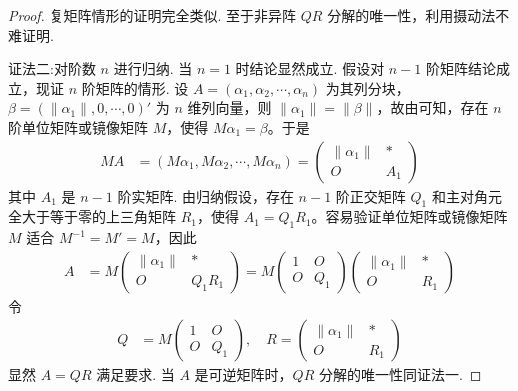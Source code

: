 \documentclass[../../main.tex]{subfiles}%
\begin{document}
\begin{proof}
复矩阵情形的证明完全类似.
至于非异阵 $QR$ 分解的唯一性，利用摄动法不难证明.

{\color{blue}证法二:}对阶数 \(n\) 进行归纳. 当 \(n = 1\) 时结论显然成立. 假设对 \(n - 1\) 阶矩阵结论成立，现证 \(n\) 阶矩阵的情形. 设 \(A = (\alpha_1,\alpha_2,\cdots,\alpha_n)\) 为其列分块，\(\beta = (\|\alpha_1\|,0,\cdots,0)'\) 为 \(n\) 维列向量，则 \(\|\alpha_1\| = \|\beta\|\)，故由可知，存在 \(n\) 阶单位矩阵或镜像矩阵 \(M\)，使得 \(M\alpha_1 = \beta\)。于是
\begin{align*}
MA &= (M\alpha_1,M\alpha_2,\cdots,M\alpha_n) = 
\begin{pmatrix}
\|\alpha_1\| & * \\
O & A_1
\end{pmatrix}
\end{align*}
其中 \(A_1\) 是 \(n - 1\) 阶实矩阵. 由归纳假设，存在 \(n - 1\) 阶正交矩阵 \(Q_1\) 和主对角元全大于等于零的上三角矩阵 \(R_1\)，使得 \(A_1 = Q_1R_1\)。容易验证单位矩阵或镜像矩阵 \(M\) 适合 \(M^{-1} = M' = M\)，因此
\begin{align*}
A &= M\begin{pmatrix}
\|\alpha_1\| & * \\
O & Q_1R_1
\end{pmatrix} = M\begin{pmatrix}
1 & O \\
O & Q_1
\end{pmatrix}\begin{pmatrix}
\|\alpha_1\| & * \\
O & R_1
\end{pmatrix}
\end{align*}
令
\begin{align*}
Q &= M\begin{pmatrix}
1 & O \\
O & Q_1
\end{pmatrix},\quad R = \begin{pmatrix}
\|\alpha_1\| & * \\
O & R_1
\end{pmatrix}
\end{align*}
显然 \(A = QR\) 满足要求. 当 \(A\) 是可逆矩阵时，\(QR\) 分解的唯一性同证法一.

\end{proof}
\end{document}

